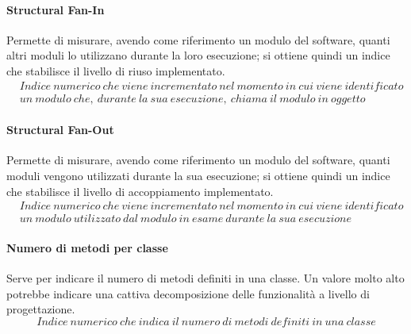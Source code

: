 \documentclass[../NormeDiProgetto.tex]{subfiles}
\begin{document}
				\paragraph{Structural Fan-In}
				Permette di misurare, avendo come riferimento un modulo del software, quanti altri moduli lo utilizzano durante la loro esecuzione; si ottiene quindi un indice che stabilisce il livello di riuso implementato.
				\begin{equation*}
					\begin{split}
						&Indice \ numerico \ che \ viene \ incrementato \ nel \ momento \ in \ cui \ viene \ identificato \\
						&un \ modulo \ che, \ durante \ la \ sua \ esecuzione, \ chiama \ il \ modulo \ in \ oggetto
					\end{split}
				\end{equation*}
				
				\paragraph{Structural Fan-Out}
				Permette di misurare, avendo come riferimento un modulo del software, quanti moduli vengono utilizzati durante la sua esecuzione; si ottiene quindi un indice che stabilisce il livello di accoppiamento implementato.
				\begin{equation*}
					\begin{split}
						&Indice \ numerico \ che \ viene \ incrementato \ nel \ momento \ in \ cui \ viene \ identificato \\
						&un \ modulo \ utilizzato \ dal \ modulo \ in \ esame \ durante \ la \ sua \ esecuzione
					\end{split}
				\end{equation*}
				
				\paragraph{Numero di metodi per classe}
			Serve per indicare il numero di metodi definiti in una classe. Un valore molto alto potrebbe indicare una cattiva decomposizione delle funzionalità a livello di progettazione.
			\begin{equation*}
					Indice \ numerico \ che \ indica \ il \ numero \ di \ metodi \ definiti \ in \ una \ classe
				\end{equation*}
			
\end{document}
